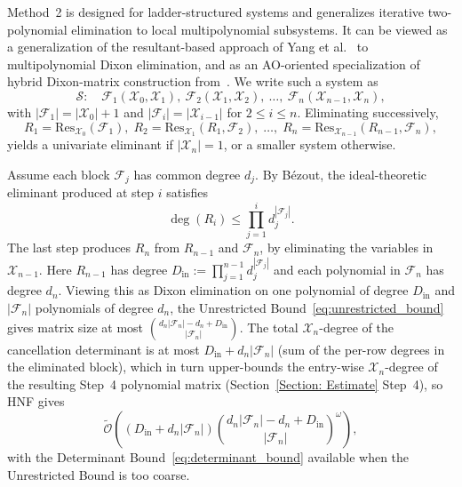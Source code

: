 Method~2 is designed for ladder-structured systems and generalizes iterative two-polynomial elimination to local multipolynomial subsystems. It can be viewed as a generalization of the resultant-based approach of Yang et al.~\cite{DBLP:conf/asiacrypt/YangZYLT24} to multipolynomial Dixon elimination, and as an AO-oriented specialization of hybrid Dixon-matrix construction from~\cite{DengQiTangDuan2022}. We write such a system as
\begin{equation}
\mathcal{S}: \quad \mathcal{F}_1(\mathcal{X}_0,\mathcal{X}_1),\ \mathcal{F}_2(\mathcal{X}_1,\mathcal{X}_2),\ \ldots,\ \mathcal{F}_n(\mathcal{X}_{n-1},\mathcal{X}_n),
\label{eq:iterative_chain}
\end{equation}
with $|\mathcal{F}_1|=|\mathcal{X}_0|+1$ and $|\mathcal{F}_i|=|\mathcal{X}_{i-1}|$ for $2\le i\le n$. Eliminating successively,
\begin{equation}
R_1 = \mathrm{Res}_{\mathcal{X}_0}(\mathcal{F}_1),\;
R_2 = \mathrm{Res}_{\mathcal{X}_1}(R_1,\mathcal{F}_2),\;\ldots,\;
R_n = \mathrm{Res}_{\mathcal{X}_{n-1}}(R_{n-1},\mathcal{F}_n),
\label{eq:iterative_resultants}
\end{equation}
yields a univariate eliminant if $|\mathcal{X}_n|=1$, or a smaller system otherwise.

Assume each block $\mathcal{F}_j$ has common degree $d_j$. By B\'ezout, the ideal-theoretic eliminant produced at step $i$ satisfies
\begin{equation}
\deg(R_i)\le \prod_{j=1}^{i} d_j^{|\mathcal{F}_j|}.
\label{eq:iterative_degree_bound}
\end{equation}
The last step produces $R_n$ from $R_{n-1}$ and $\mathcal{F}_n$, by eliminating the variables in $\mathcal{X}_{n-1}$. Here $R_{n-1}$ has degree $D_{\mathrm{in}}:=\prod_{j=1}^{n-1} d_j^{|\mathcal{F}_j|}$ and each polynomial in $\mathcal{F}_n$ has degree $d_n$. Viewing this as Dixon elimination on one polynomial of degree $D_{\mathrm{in}}$ and $|\mathcal{F}_n|$ polynomials of degree $d_n$, the Unrestricted Bound~\eqref{eq:unrestricted_bound} gives matrix size at most $\binom{d_n|\mathcal{F}_n|-d_n+D_{\mathrm{in}}}{|\mathcal{F}_n|}$. The total $\mathcal{X}_n$-degree of the cancellation determinant is at most $D_{\mathrm{in}}+d_n|\mathcal{F}_n|$ (sum of the per-row degrees in the eliminated block), which in turn upper-bounds the entry-wise $\mathcal{X}_n$-degree of the resulting Step~4 polynomial matrix (Section~\ref{Section: Estimate} Step~4), so HNF gives
\begin{equation}
\widetilde{\mathcal{O}}\!\left((D_{\mathrm{in}}+d_n|\mathcal{F}_n|)\binom{d_n|\mathcal{F}_n|-d_n+D_{\mathrm{in}}}{|\mathcal{F}_n|}^{\omega}\right),
\label{eq:iterative_sequential_complexity}
\end{equation}
with the Determinant Bound~\eqref{eq:determinant_bound} available when the Unrestricted Bound is too coarse.

